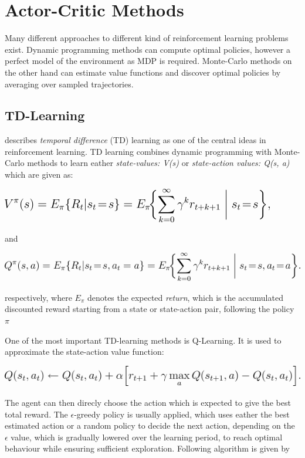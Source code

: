 \section{Actor-Critic Methods}
\raggedbottom 
Many different approaches to different kind of reinforcement learning problems exist. 
Dynamic programming methods can compute optimal policies, however a perfect model of the environment as MDP is required.
Monte-Carlo methods on the other hand can estimate value functions and discover optimal policies by averaging over sampled trajectories.

\subsection{TD-Learning}

\cite{Sut98} describes \textit{temporal difference} (TD) learning as one of the central ideas in reinforcement learning.
TD learning combines dynamic programming with Monte-Carlo methods to learn eather \textit{state-values: V(s)} or \textit{state-action values: Q(s, a)} which are given as:

\includegraphics[scale=0.5]{bilder/valfct.png}

and

\includegraphics[scale=0.5]{bilder/qvalfct.png}

respectively, where \textit{$E_{\pi}$} denotes the expected \textit{return}, which is the accumulated discounted reward starting from a state or state-action pair, following the policy $\pi$

One of the most important TD-learning methods is Q-Learning. 
It is used to approximate the state-action value function:

\includegraphics[scale=0.5]{bilder/qlearning1.png}

The agent can then direcly choose the action which is expected to give the best total reward.
The $\epsilon$-greedy policy is usually applied, which uses eather the best estimated action or a random policy to decide the next action, depending on the $\epsilon$ value, which is gradually lowered over the learning period, to reach optimal behaviour while ensuring sufficient exploration.
Following algorithm is given by \citet{Sut98}

